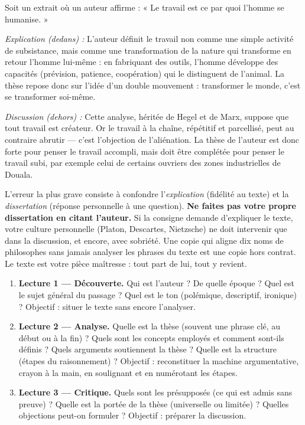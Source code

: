 \documentclass[11pt]{article}
\newcommand{\cle}[1]{{\popxbold\color{popdark}#1}}
\newcounter{popsec}
\newcounter{popsub}
\newcommand{\courssub}[1]{%
  \stepcounter{popsub}%
  \par\vspace{9pt}\noindent{\popxbold\fontsize{11.5}{13}\selectfont\color{popink}{\color{poporange}\thepopsec.\thepopsub}\hspace{6pt}#1}\par\nopagebreak\vspace{4pt}
}
\begin{document}
\begin{exemplebox}
Soit un extrait où un auteur affirme : « Le travail est ce par quoi l'homme se humanise. »

\emph{Explication (dedans) :} L'auteur définit le travail non comme une simple activité de subsistance, mais comme une transformation de la nature qui transforme en retour l'homme lui-même : en fabriquant des outils, l'homme développe des capacités (prévision, patience, coopération) qui le distinguent de l'animal. La thèse repose donc sur l'idée d'un double mouvement : transformer le monde, c'est se transformer soi-même.

\emph{Discussion (dehors) :} Cette analyse, héritée de Hegel et de Marx, suppose que tout travail est créateur. Or le travail à la chaîne, répétitif et parcellisé, peut au contraire abrutir — c'est l'objection de l'aliénation. La thèse de l'auteur est donc forte pour penser le travail accompli, mais doit être complétée pour penser le travail subi, par exemple celui de certains ouvriers des zones industrielles de Douala.
\end{exemplebox}

\begin{attention}
L'erreur la plus grave consiste à confondre l'\emph{explication} (fidélité au texte) et la \emph{dissertation} (réponse personnelle à une question). \textbf{Ne faites pas votre propre dissertation en citant l'auteur.} Si la consigne demande d'expliquer le texte, votre culture personnelle (Platon, Descartes, Nietzsche) ne doit intervenir que dans la discussion, et encore, avec sobriété. Une copie qui aligne dix noms de philosophes sans jamais analyser les phrases du texte est une copie hors contrat. Le texte est votre pièce maîtresse : tout part de lui, tout y revient.
\end{attention}

\courssub{La méthode des trois lectures}

\begin{methode}
\begin{enumerate}
\item \textbf{Lecture 1 — Découverte.} Qui est l'auteur ? De quelle époque ? Quel est le sujet général du passage ? Quel est le ton (polémique, descriptif, ironique) ? Objectif : situer le texte sans encore l'analyser.
\item \textbf{Lecture 2 — Analyse.} Quelle est la \cle{thèse} (souvent une phrase clé, au début ou à la fin) ? Quels sont les \cle{concepts} employés et comment sont-ils définis ? Quels \cle{arguments} soutiennent la thèse ? Quelle est la \cle{structure} (étapes du raisonnement) ? Objectif : reconstituer la machine argumentative, crayon à la main, en soulignant et en numérotant les étapes.
\item \textbf{Lecture 3 — Critique.} Quels sont les \cle{présupposés} (ce qui est admis sans preuve) ? Quelle est la \cle{portée} de la thèse (universelle ou limitée) ? Quelles \cle{objections} peut-on formuler ? Objectif : préparer la discussion.
\end{enumerate}
\end{methode}
\end{document}
